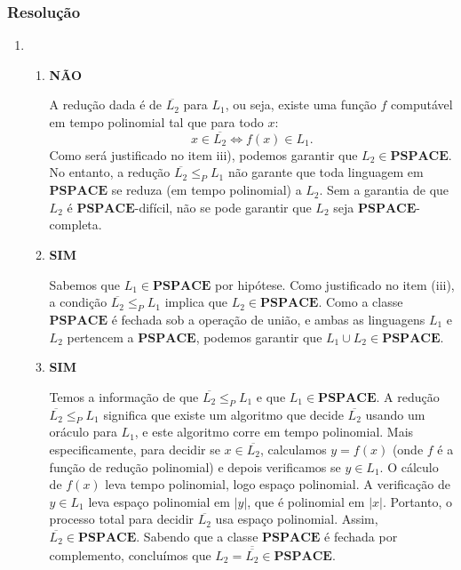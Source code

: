 \documentclass[a4paper,12pt]{article}
\begin{document}
\subsubsection*{Resolução}
\begin{enumerate}[label=\alph*)]
  \item \begin{enumerate}[label=(\roman*)]
    \item \textbf{NÃO}
    
    \vspace{0.3cm}
    A redução dada é de \( \overline{L_2} \) para \( L_1 \), ou seja, existe uma função \(f\) computável em tempo polinomial tal que para todo \( x \):
    \[
    x \in \overline{L_2} \iff f(x) \in L_1.
    \]
    Como será justificado no item iii), podemos garantir que \( L_2 \in \mathbf{PSPACE} \). No entanto, a redução \(\overline{L_2} \leq_P L_1\) não garante que toda linguagem em \( \mathbf{PSPACE} \) se reduza (em tempo polinomial) a \( L_2 \). Sem a garantia de que \( L_2 \) é \( \mathbf{PSPACE} \)-difícil, não se pode garantir que \( L_2 \) seja \( \mathbf{PSPACE} \)-completa.

    \vspace{0.5cm}
    \item \textbf{SIM}

    \vspace{0.3cm}
    Sabemos que \( L_1 \in \mathbf{PSPACE} \) por hipótese. Como justificado no item (iii), a condição \( \overline{L_2} \leq_P L_1 \) implica que \( L_2 \in \mathbf{PSPACE} \).
    Como a classe \( \mathbf{PSPACE} \) é fechada sob a operação de união, e ambas as linguagens \( L_1 \) e \( L_2 \) pertencem a \( \mathbf{PSPACE} \), podemos garantir que \( L_1 \cup L_2 \in \mathbf{PSPACE} \).

    \vspace{0.5cm}
    \item \textbf{SIM}

    \vspace{0.3cm}
    Temos a informação de que \( \overline{L_2} \leq_P L_1 \) e que \( L_1 \in \mathbf{PSPACE} \).
    A redução \( \overline{L_2} \leq_P L_1 \) significa que existe um algoritmo que decide \( \overline{L_2} \) usando um oráculo para \( L_1 \), e este algoritmo corre em tempo polinomial. Mais especificamente, para decidir se \( x \in \overline{L_2} \), calculamos \( y = f(x) \) (onde \( f \) é a função de redução polinomial) e depois verificamos se \( y \in L_1 \).
    O cálculo de \( f(x) \) leva tempo polinomial, logo espaço polinomial. A verificação de \( y \in L_1 \) leva espaço polinomial em \( |y| \), que é polinomial em \( |x| \). Portanto, o processo total para decidir \( \overline{L_2} \) usa espaço polinomial. Assim, \( \overline{L_2} \in \mathbf{PSPACE} \).
    Sabendo que a classe \( \mathbf{PSPACE} \) é fechada por complemento, concluímos que \( L_2 = \overline{\overline{L_2}} \in \mathbf{PSPACE} \).
  \end{enumerate}
\end{enumerate}
\end{document}
